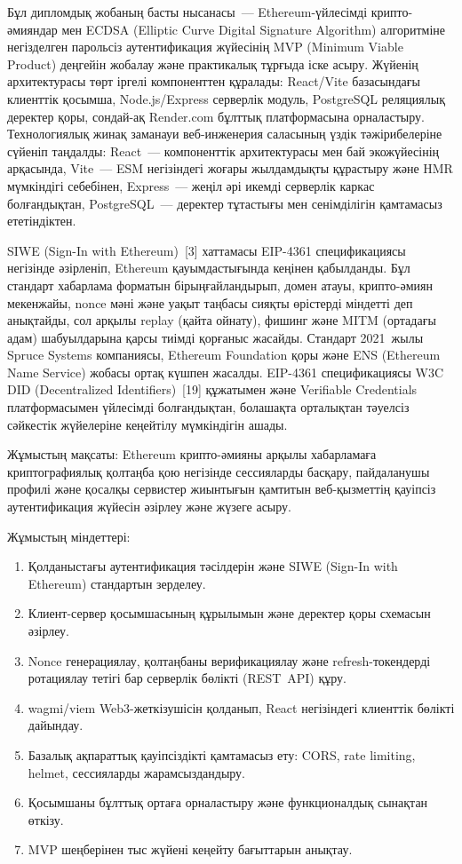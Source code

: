 \documentclass[14pt,a4paper]{extarticle}
\begin{document}
Бұл дипломдық жобаның басты нысанасы~--- Ethereum-үйлесімді крипто-әмияндар мен ECDSA (Elliptic Curve Digital Signature Algorithm) алгоритміне негізделген парольсіз аутентификация жүйесінің MVP (Minimum Viable Product) деңгейін жобалау және практикалық тұрғыда іске асыру. Жүйенің архитектурасы төрт іргелі компоненттен құралады: React/Vite базасындағы клиенттік қосымша, Node.js/Express серверлік модуль, PostgreSQL реляциялық деректер қоры, сондай-ақ Render.com бұлттық платформасына орналастыру. Технологиялық жинақ заманауи веб-инженерия саласының үздік тәжірибелеріне сүйеніп таңдалды: React~--- компоненттік архитектурасы мен бай экожүйесінің арқасында, Vite~--- ESM негізіндегі жоғары жылдамдықты құрастыру және HMR мүмкіндігі себебінен, Express~--- жеңіл әрі икемді серверлік каркас болғандықтан, PostgreSQL~--- деректер тұтастығы мен сенімділігін қамтамасыз ететіндіктен.

SIWE (Sign-In with Ethereum)~[3] хаттамасы EIP-4361 спецификациясы негізінде әзірленіп, Ethereum қауымдастығында кеңінен қабылданды. Бұл стандарт хабарлама форматын бірыңғайландырып, домен атауы, крипто-әмиян мекенжайы, nonce мәні және уақыт таңбасы сияқты өрістерді міндетті деп анықтайды, сол арқылы replay (қайта ойнату), фишинг және MITM (ортадағы адам) шабуылдарына қарсы тиімді қорғаныс жасайды. Стандарт 2021~жылы Spruce Systems компаниясы, Ethereum Foundation қоры және ENS (Ethereum Name Service) жобасы ортақ күшпен жасалды. EIP-4361 спецификациясы W3C DID (Decentralized Identifiers)~[19] құжатымен және Verifiable Credentials платформасымен үйлесімді болғандықтан, болашақта орталықтан тәуелсіз сәйкестік жүйелеріне кеңейтілу мүмкіндігін ашады.

Жұмыстың мақсаты: Ethereum крипто-әмияны арқылы хабарламаға криптографиялық қолтаңба қою негізінде сессияларды басқару, пайдаланушы профилі және қосалқы сервистер жиынтығын қамтитын веб-қызметтің қауіпсіз аутентификация жүйесін әзірлеу және жүзеге асыру.

Жұмыстың міндеттері:
\begin{enumerate}[nosep]
\item Қолданыстағы аутентификация тәсілдерін және SIWE (Sign-In with Ethereum) стандартын зерделеу.
\item Клиент-сервер қосымшасының құрылымын және деректер қоры схемасын әзірлеу.
\item Nonce генерациялау, қолтаңбаны верификациялау және refresh-токендерді ротациялау тетігі бар серверлік бөлікті (REST~API) құру.
\item wagmi/viem Web3-жеткізушісін қолданып, React негізіндегі клиенттік бөлікті дайындау.
\item Базалық ақпараттық қауіпсіздікті қамтамасыз ету: CORS, rate limiting, helmet, сессияларды жарамсыздандыру.
\item Қосымшаны бұлттық ортаға орналастыру және функционалдық сынақтан өткізу.
\item MVP шеңберінен тыс жүйені кеңейту бағыттарын анықтау.
\end{enumerate}
\end{document}
